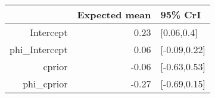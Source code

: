 \begin{tabular}{rrl}
  \hline
 & Expected mean & 95\% CrI \\ 
  \hline
Intercept & 0.23 & [0.06,0.4] \\ 
  phi\_Intercept & 0.06 & [-0.09,0.22] \\ 
  cprior & -0.06 & [-0.63,0.53] \\ 
  phi\_cprior & -0.27 & [-0.69,0.15] \\ 
   \hline
\end{tabular}

